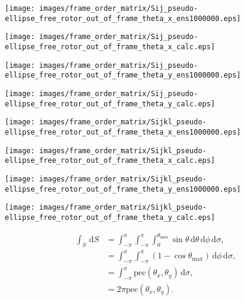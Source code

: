 \documentclass[a4paper,11pt,twoside,openright]{book}
\providecommand{\pec}{{\mathrm{pec}}}%
\def\lthtmlcheckvsize{\ifdim\ht\sizebox<\vsize 
  \ifdim\wd\sizebox<\hsize\expandafter\hfill\fi \expandafter\vfill
  \else\expandafter\vss\fi}%
\begin{document}
{\newpage\clearpage
{}%
\texttt{[image: images/frame\_order\_matrix/Sij\_pseudo-ellipse\_free\_rotor\_out\_of\_frame\_theta\_x\_ens1000000.eps]}%
\lthtmlpictureZ
\lthtmlcheckvsize\clearpage}

{\newpage\clearpage
{}%
\texttt{[image: images/frame\_order\_matrix/Sij\_pseudo-ellipse\_free\_rotor\_out\_of\_frame\_theta\_x\_calc.eps]}%
\lthtmlpictureZ
\lthtmlcheckvsize\clearpage}

{\newpage\clearpage
{}%
\texttt{[image: images/frame\_order\_matrix/Sij\_pseudo-ellipse\_free\_rotor\_out\_of\_frame\_theta\_y\_ens1000000.eps]}%
\lthtmlpictureZ
\lthtmlcheckvsize\clearpage}

{\newpage\clearpage
{}%
\texttt{[image: images/frame\_order\_matrix/Sij\_pseudo-ellipse\_free\_rotor\_out\_of\_frame\_theta\_y\_calc.eps]}%
\lthtmlpictureZ
\lthtmlcheckvsize\clearpage}

{\newpage\clearpage
{}%
\texttt{[image: images/frame\_order\_matrix/Sijkl\_pseudo-ellipse\_free\_rotor\_out\_of\_frame\_theta\_x\_ens1000000.eps]}%
\lthtmlpictureZ
\lthtmlcheckvsize\clearpage}

{\newpage\clearpage
{}%
\texttt{[image: images/frame\_order\_matrix/Sijkl\_pseudo-ellipse\_free\_rotor\_out\_of\_frame\_theta\_x\_calc.eps]}%
\lthtmlpictureZ
\lthtmlcheckvsize\clearpage}

{\newpage\clearpage
{}%
\texttt{[image: images/frame\_order\_matrix/Sijkl\_pseudo-ellipse\_free\_rotor\_out\_of\_frame\_theta\_y\_ens1000000.eps]}%
\lthtmlpictureZ
\lthtmlcheckvsize\clearpage}

{\newpage\clearpage
{}%
\texttt{[image: images/frame\_order\_matrix/Sijkl\_pseudo-ellipse\_free\_rotor\_out\_of\_frame\_theta\_y\_calc.eps]}%
\lthtmlpictureZ
\lthtmlcheckvsize\clearpage}

{\newpage\clearpage
\setcounter{equation}{61}
%
\begin{subequations}\begin{align}
\int_S \,\mathrm{d}S &= \int_{-\pi}^{\pi} \int_{-\pi}^{\pi} \int_{0}^{\theta_{\textrm{max}}} \sin\theta \,\mathrm{d}\theta \,\mathrm{d}\phi \,\mathrm{d}\sigma , \\
&= \int_{-\pi}^{\pi} \int_{-\pi}^{\pi} \left( 1 - \cos\theta_{\textrm{max}}\right) \,\mathrm{d}\phi \,\mathrm{d}\sigma , \\
&= \int_{-\pi}^{\pi} \pec (\theta_x , \theta_y ) \,\mathrm{d}\sigma , \\
&= 2\pi \pec (\theta_x , \theta_y ) .
\end{align}\end{subequations}%
\lthtmldisplayZ
\lthtmlcheckvsize\clearpage}
\end{document}
